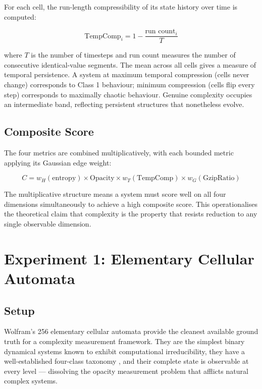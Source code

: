 \documentclass[12pt,a4paper]{article}
\begin{document}
For each cell, the run-length compressibility of its state history
over time is computed:

\begin{equation}
\text{TempComp}_i = 1 - \frac{\text{run count}_i}{T}
\end{equation}

where $T$ is the number of timesteps and run count measures the number
of consecutive identical-value segments.
The mean across all cells gives a measure of temporal persistence.
A system at maximum temporal compression (cells never change) corresponds
to Class 1 behaviour; minimum compression (cells flip every step)
corresponds to maximally chaotic behaviour.
Genuine complexity occupies an intermediate band, reflecting persistent
structures that nonetheless evolve.

\subsection{Composite Score}

The four metrics are combined multiplicatively, with each bounded metric
applying its Gaussian edge weight:

\begin{equation}
C = w_H(\text{entropy}) \times \text{Opacity} \times w_T(\text{TempComp}) \times w_G(\text{GzipRatio})
\end{equation}

The multiplicative structure means a system must score well on all four
dimensions simultaneously to achieve a high composite score.
This operationalises the theoretical claim that complexity is the
property that resists reduction to any single observable dimension.

\section{Experiment 1: Elementary Cellular Automata}

\subsection{Setup}

Wolfram's 256 elementary cellular automata provide the cleanest
available ground truth for a complexity measurement framework.
They are the simplest binary dynamical systems known to exhibit
computational irreducibility, they have a well-established four-class
taxonomy \citep{wolfram2002}, and their complete state is observable
at every level — dissolving the opacity measurement problem that afflicts
natural complex systems.
\end{document}
